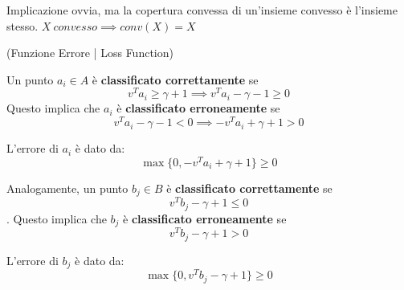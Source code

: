 Implicazione ovvia, ma la copertura convessa di un'insieme convesso è l'insieme
stesso. $ X\ convesso \implies conv(X) = X $

\begin{definition}
    (Funzione Errore | Loss Function)

    Un punto $a_i \in A$ è \textbf{classificato correttamente} se $$ v^T a_i \geq
        \gamma + 1 \implies v^T a_i - \gamma - 1 \geq 0 $$ Questo implica che $a_i$ è
    \textbf{classificato erroneamente} se $$ v^T a_i - \gamma -1 < 0 \implies -v^T
        a_i + \gamma + 1 > 0 $$

    L'errore di $a_i$ è dato da: $$ \max\{0, -v^T a_i + \gamma + 1\} \geq 0 $$

    Analogamente, un punto $b_j \in B$ è \textbf{classificato correttamente} se $$
        v^T b_j - \gamma + 1 \leq 0 $$. Questo implica che $b_j$ è \textbf{classificato
        erroneamente} se $$ v^T b_j - \gamma + 1 > 0 $$

    L'errore di $b_j$ è dato da: $$ \max\{0, v^T b_j - \gamma + 1\} \geq 0 $$
\end{definition}
